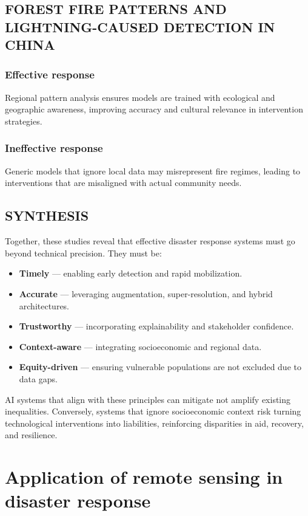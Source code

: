 \documentclass[conference,a4paper]{IEEEtran}
\begin{document}
\subsection{FOREST FIRE PATTERNS AND LIGHTNING-CAUSED DETECTION IN CHINA}
\subsubsection{Effective response}
Regional pattern analysis ensures models are trained with ecological and geographic awareness, improving accuracy and cultural relevance in intervention strategies.
\subsubsection{Ineffective response}
Generic models that ignore local data may misrepresent fire regimes, leading to interventions that are misaligned with actual community needs.
\subsection{SYNTHESIS}
Together, these studies reveal that effective disaster response systems must go beyond technical precision. They must be:
\begin{itemize}
    \item \textbf{Timely} — enabling early detection and rapid mobilization.
    \item \textbf{Accurate} — leveraging augmentation, super-resolution, and hybrid architectures.
    \item \textbf{Trustworthy} — incorporating explainability and stakeholder confidence.
    \item \textbf{Context-aware} — integrating socioeconomic and regional data.
    \item \textbf{Equity-driven} — ensuring vulnerable populations are not excluded due to data gaps.
\end{itemize}
AI systems that align with these principles can mitigate not amplify existing inequalities. Conversely, systems that ignore socioeconomic context risk turning technological interventions into liabilities, reinforcing disparities in aid, recovery, and resilience.


\section{Application of remote sensing in disaster response}

\end{document}
